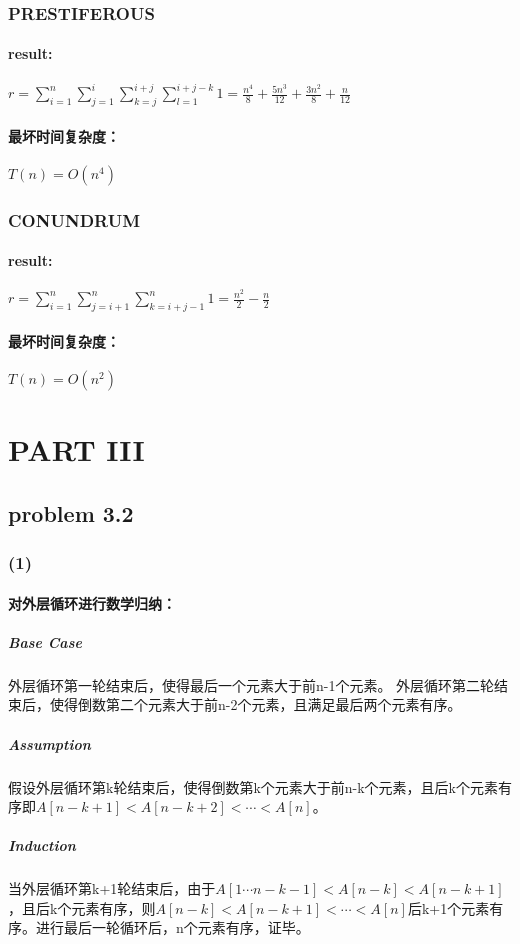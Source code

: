\documentclass[11pt]{ctexart}
\begin{document}
	\subsubsection*{PRESTIFEROUS}
	\paragraph{result:}
	$r= \sum_{i=1}^{n}\sum_{j=1}^{i}\sum_{k=j}^{i+j}\sum_{l=1}^{i+j-k} 1=\frac{n^4}{8}+\frac{5n^3}{12}+\frac{3n^2}{8}+\frac{n}{12}$
	\paragraph{最坏时间复杂度：} $T(n)=O(n^4)$
	\subsubsection*{CONUNDRUM}
	\paragraph{result:}
	$r= \sum_{i=1}^{n}\sum_{j=i+1}^{n}\sum_{k=i+j-1}^{n} 1=\frac{n^2}{2}-\frac{n}{2}$
	\paragraph{最坏时间复杂度：} $T(n)=O(n^2)$
	\newpage
	\section*{PART III}
	\subsection*{problem 3.2}
	\subsubsection*{(1)}
	\paragraph{对外层循环进行数学归纳：} 
	\subparagraph{Base Case}
	外层循环第一轮结束后，使得最后一个元素大于前n-1个元素。
	外层循环第二轮结束后，使得倒数第二个元素大于前n-2个元素，且满足最后两个元素有序。
	\subparagraph{Assumption}
	假设外层循环第k轮结束后，使得倒数第k个元素大于前n-k个元素，且后k个元素有序即$A[n-k+1]<A[n-k+2]<\cdots<A[n]$。
	\subparagraph{Induction}
	当外层循环第k+1轮结束后，由于$A[1\cdots n-k-1]<A[n-k]<A[n-k+1]$，且后k个元素有序，则$A[n-k]<A[n-k+1]<\cdots<A[n]$后k+1个元素有序。进行最后一轮循环后，n个元素有序，证毕。
\end{document}
